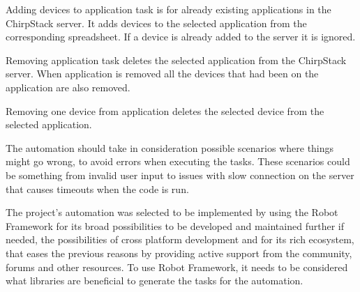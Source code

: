 Adding devices to application task is for already existing applications in the ChirpStack server.
It adds devices to the selected application from the corresponding spreadsheet.
If a device is already added to the server it is ignored.

Removing application task deletes the selected application from the ChirpStack server.
When application is removed all the devices that had been on the application are also removed.

Removing one device from application deletes the selected device from the selected application.

The automation should take in consideration possible scenarios where things might go wrong, to avoid errors when executing the tasks.
These scenarios could be something from invalid user input to issues with slow connection on the server that causes timeouts when the code is run.

The project's automation was selected to be implemented by using the Robot Framework for its broad possibilities to be developed and maintained further if needed, the possibilities of cross platform development and for its rich ecosystem, that eases the previous reasons by providing active support from the community, forums and other resources.
To use Robot Framework, it needs to be considered what libraries are beneficial to generate the tasks for the automation.


\clearpage %
